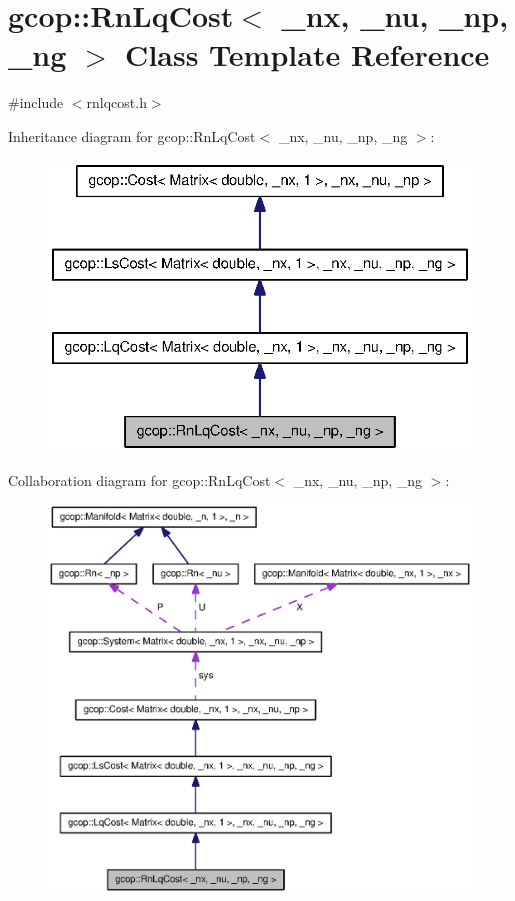 \section{gcop\-:\-:\-Rn\-Lq\-Cost$<$ \-\_\-nx, \-\_\-nu, \-\_\-np, \-\_\-ng $>$ \-Class \-Template \-Reference}
\label{classgcop_1_1RnLqCost}


{\ttfamily \#include $<$rnlqcost.\-h$>$}



\-Inheritance diagram for gcop\-:\-:\-Rn\-Lq\-Cost$<$ \-\_\-nx, \-\_\-nu, \-\_\-np, \-\_\-ng $>$\-:\nopagebreak
\begin{figure}[H]
\begin{center}
\leavevmode
\includegraphics[width=330pt]{classgcop_1_1RnLqCost__inherit__graph}
\end{center}
\end{figure}


\-Collaboration diagram for gcop\-:\-:\-Rn\-Lq\-Cost$<$ \-\_\-nx, \-\_\-nu, \-\_\-np, \-\_\-ng $>$\-:\nopagebreak
\begin{figure}[H]
\begin{center}
\leavevmode
\includegraphics[width=350pt]{classgcop_1_1RnLqCost__coll__graph}
\end{center}
\end{figure}
